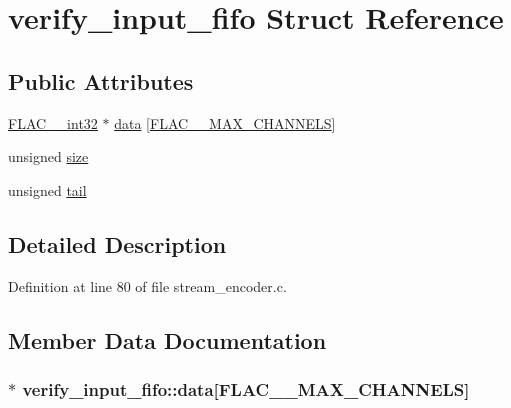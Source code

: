 \hypertarget{structverify__input__fifo}{}\section{verify\+\_\+input\+\_\+fifo Struct Reference}
\label{structverify__input__fifo}
\subsection*{Public Attributes}
\begin{DoxyCompactItemize}
\item 
\hyperlink{ordinals_8h_a33fd77bfe6d685541a0c034a75deccdc}{F\+L\+A\+C\+\_\+\+\_\+int32} $\ast$ \hyperlink{structverify__input__fifo_ae91017d59afcf9473d432eca177844d7}{data} \mbox{[}\hyperlink{group__flac__format_ga488aa5678a58d08f984f5d39185b763d}{F\+L\+A\+C\+\_\+\+\_\+\+M\+A\+X\+\_\+\+C\+H\+A\+N\+N\+E\+LS}\mbox{]}
\item 
unsigned \hyperlink{structverify__input__fifo_ab9396a19f516f769a6f73b45941cd037}{size}
\item 
unsigned \hyperlink{structverify__input__fifo_af861deb13a34f9a89e96f5c6d806eff3}{tail}
\end{DoxyCompactItemize}


\subsection{Detailed Description}


Definition at line 80 of file stream\+\_\+encoder.\+c.



\subsection{Member Data Documentation}
\subsubsection[{\texorpdfstring{data}{data}}]{$\ast$ verify\+\_\+input\+\_\+fifo\+::data\mbox{[}{\bf F\+L\+A\+C\+\_\+\+\_\+\+M\+A\+X\+\_\+\+C\+H\+A\+N\+N\+E\+LS}\mbox{]}}\hypertarget{structverify__input__fifo_ae91017d59afcf9473d432eca177844d7}{}\label{structverify__input__fifo_ae91017d59afcf9473d432eca177844d7}


